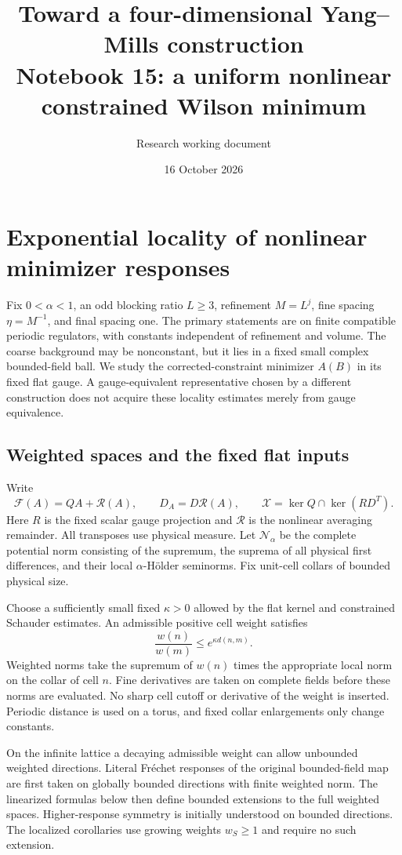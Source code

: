 \documentclass[11pt]{article}
\title{Toward a four-dimensional Yang--Mills construction\\
\large Notebook 15: a uniform nonlinear constrained Wilson minimum}
\author{Research working document}
\date{16 October 2026}
\theoremstyle{remark}
\newcommand{\norm}[1]{\left\|#1\right\|}
\begin{document}

\section{Exponential locality of nonlinear minimizer responses}
\label{wr-section}

Fix $0<\alpha<1$, an odd blocking ratio $L\ge3$, refinement
$M=L^j$, fine spacing $\eta=M^{-1}$, and final spacing one.
The primary statements are on finite compatible periodic
regulators, with constants independent of refinement and volume.
The coarse background may be nonconstant, but it lies in a fixed
small complex bounded-field ball. We study the corrected-constraint
minimizer $A(B)$ in its fixed flat gauge. A gauge-equivalent
representative chosen by a different construction does not acquire
these locality estimates merely from gauge equivalence.

\subsection{Weighted spaces and the fixed flat inputs}
\label{wr-spaces}

Write
\[
 \mathcal F(A)=QA+\mathcal R(A),\qquad
 D_A=D\mathcal R(A),\qquad
 \mathcal X=\ker Q\cap\ker(RD^T).
\]
Here $R$ is the fixed scalar gauge projection and
$\mathcal R$ is the nonlinear averaging remainder. All transposes
use physical measure. Let $\mathcal N_\alpha$ be the complete
potential norm consisting of the supremum, the suprema of all
physical first differences, and their local $\alpha$-H\"older
seminorms. Fix unit-cell collars of bounded physical size.

Choose a sufficiently small fixed $\kappa>0$ allowed by the flat
kernel and constrained Schauder estimates. An admissible positive
cell weight satisfies
\begin{equation}\label{wr-weight}
 \frac{w(n)}{w(m)}\le e^{\kappa d(n,m)}.
\end{equation}
Weighted norms take the supremum of $w(n)$ times the appropriate
local norm on the collar of cell $n$. Fine derivatives are taken
on complete fields before these norms are evaluated. No sharp cell
cutoff or derivative of the weight is inserted. Periodic distance
is used on a torus, and fixed collar enlargements only change
constants.

On the infinite lattice a decaying admissible weight can allow
unbounded weighted directions. Literal Fr\'echet responses of the
original bounded-field map are first taken on globally bounded
directions with finite weighted norm. The linearized formulas
below then define bounded extensions to the full weighted spaces.
Higher-response symmetry is initially understood on bounded
directions. The localized corollaries use growing weights
$w_S\ge1$ and require no such extension.
\end{document}
